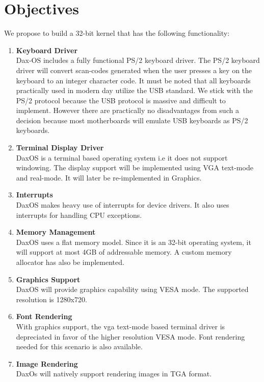 \section{Objectives}\label{section:Objectives}
We propose to build a 32-bit kernel that has the following functionality:
\begin{enumerate}
	
	\item \textbf{Keyboard Driver} \\
	Dax-OS includes a fully functional PS/2 keyboard driver. The PS/2 keyboard driver will convert scan-codes generated when the user presses a key on the keyboard to an integer character code. It must be noted that all keyboards practically used in modern day utilize the USB standard. We stick with the PS/2 protocol because the USB protocol is massive and difficult to implement. However there are practically no disadvantages from such a decision because most motherboards will emulate USB keyboards as PS/2 keyboards.
	
	\item \textbf{Terminal Display Driver} \\
	DaxOS is a terminal based operating system i.e it does not support windowing.
	The display support will be implemented using VGA text-mode and real-mode.
	It will later be re-implemented in Graphics.
	
	\item \textbf{Interrupts}  \\
	DaxOS makes heavy use of interrupts for device drivers. It also uses interrupts for handling CPU exceptions. 

	\item \textbf{Memory Management} \\
	DaxOS uses a flat memory model.
	Since it is an 32-bit operating system, it will support at most 4GB of addressable memory. 
	A custom memory allocator has also be implemented.

	\item \textbf{Graphics Support} \\
	DaxOS will provide graphics capability using VESA mode. The supported resolution is 1280x720. 

	\item \textbf{Font Rendering} \\
	With graphics support, the vga text-mode based terminal driver is depreciated in favor of the higher resolution VESA mode.
	Font rendering needed for this scenario is also available.

	\item \textbf{Image Rendering} \\
	DaxOs will natively support rendering images in TGA format.
\end{enumerate}

